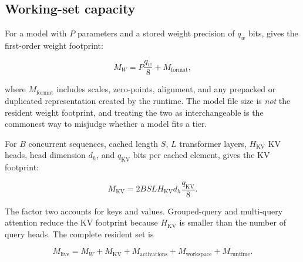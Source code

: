 \subsection{Working-set capacity}
\label{sec:working-set}

For a model with \(P\) parameters and a stored weight precision of
\(q_w\) bits,  gives the first-order weight
footprint:

\begin{equation}
\label{eq:weights}
  M_W = P\frac{q_w}{8} + M_{\mathrm{format}},
\end{equation}

where \(M_{\mathrm{format}}\) includes scales, zero-points, alignment,
and any prepacked or duplicated representation created by the runtime.
The model file size is \emph{not} the resident weight footprint, and
treating the two as interchangeable is the commonest way to misjudge
whether a model fits a tier.

For \(B\) concurrent sequences, cached length \(S\), \(L\) transformer
layers, \(H_{\mathrm{KV}}\) KV heads, head dimension \(d_h\), and
\(q_{\mathrm{KV}}\) bits per cached element,  gives the
KV footprint:

\begin{equation}
\label{eq:kv}
  M_{\mathrm{KV}} =
  2 B S L H_{\mathrm{KV}} d_h \frac{q_{\mathrm{KV}}}{8}.
\end{equation}

The factor two accounts for keys and values.  Grouped-query and
multi-query attention reduce the KV footprint because
\(H_{\mathrm{KV}}\) is smaller than the number of query heads.  The
complete resident set is

\begin{equation}
\label{eq:live}
  M_{\mathrm{live}} =
  M_W + M_{\mathrm{KV}} + M_{\mathrm{activations}}
  + M_{\mathrm{workspace}} + M_{\mathrm{runtime}}.
\end{equation}

